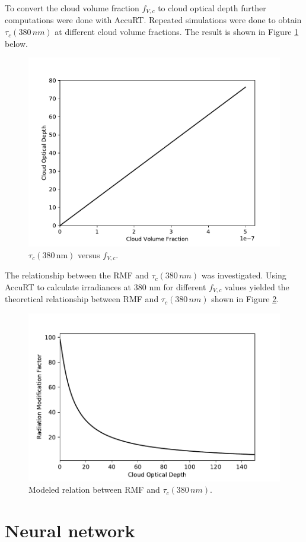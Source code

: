 \documentclass{optica-article}
\begin{document}
To convert the cloud volume fraction $f_{V,c}$ to cloud optical depth further computations were done with AccuRT.
Repeated simulations were done to obtain $\tau_c{\scriptstyle(380 \, nm)}$ at different cloud volume fractions.
The result is shown in Figure \ref{fig:codvsvolf} below.

\begin{figure}[H]
	\centering
	\includegraphics[width=0.7\linewidth]{COD_VS_Volf}
	\caption{$\tau_c{\scriptstyle(380 \, \text{nm})}$ versus $f_{V,c}$.}
	\label{fig:codvsvolf}
\end{figure}


The relationship between the RMF and $\tau_c{\scriptstyle(380 \, nm)}$ was investigated. 
Using AccuRT to calculate irradiances at 380 nm for different $f_{V,c}$ values yielded the theoretical relationship between RMF and $\tau_c{\scriptstyle(380 \, nm)}$ shown in Figure \ref{fig:rmfvscod380}.

\begin{figure}[H]
	\centering
	\includegraphics[width=0.7\linewidth]{RMF_vs_COD_380}
	\caption{Modeled relation between RMF and $\tau_c{\scriptstyle(380 \, nm)}$.}
	\label{fig:rmfvscod380}
\end{figure}


\section{Neural network}
\label{sec-nn}
\end{document}

